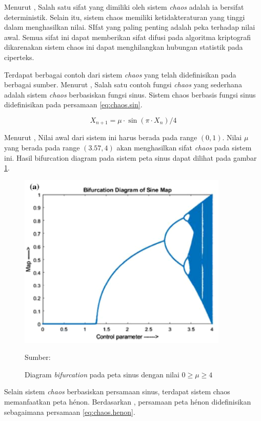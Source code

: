 Menurut \textcite{munir2019}, Salah satu sifat yang dimiliki oleh sistem \emph{chaos} adalah ia bersifat deterministik. Selain itu, sistem chaos memiliki ketidakteraturan yang tinggi dalam menghasilkan nilai. SIfat yang paling penting adalah peka terhadap nilai awal. Semua sifat ini dapat memberikan sifat difusi pada algoritma kriptografi dikarenakan sistem chaos ini dapat menghilangkan hubungan statistik pada ciperteks.

Terdapat berbagai contoh dari sistem \emph{chaos} yang telah didefinisikan pada berbagai sumber. Menurut \textcite{patel2021}, Salah satu contoh fungsi \emph{chaos} yang sederhana adalah sistem \emph{chaos} berbasiskan fungsi sinus. Sistem chaos berbasis fungsi sinus didefinisikan pada persamaan \ref{eq:chaos.sin}.

\begin{equation}
  \label{eq:chaos.sin}
  X_{n+1} = \mu \cdot \sin(\pi \cdot X_n) / 4
\end{equation}

Menurut \textcite{patel2021}, Nilai awal dari sistem ini harus berada pada range $(0, 1)$. Nilai $\mu$ yang berada pada range $(3.57, 4)$ akan menghasilkan sifat \emph{chaos} pada sistem ini. Hasil bifurcation diagram pada sistem peta sinus dapat dilihat pada gambar \ref{fig:chaos.sin.bifurcation}.

\begin{figure}[!h]
  \centering
  \includegraphics[width=10cm]{chapters/res/chapter-2/img/sine.bifurcation.png}
  \caption{Diagram \emph{bifurcation} pada peta sinus dengan nilai $0 \ge \mu \ge 4$} \label{fig:chaos.sin.bifurcation}
  Sumber: \textcite{patel2021}
\end{figure}


Selain sistem \emph{chaos} berbasiskan persamaan sinus, terdapat sistem chaos memanfaatkan peta hénon. Berdasarkan \textcite{henon1976}, persamaan peta hénon didefinisikan sebagaimana persamaan \ref{eq:chaos.henon}.

